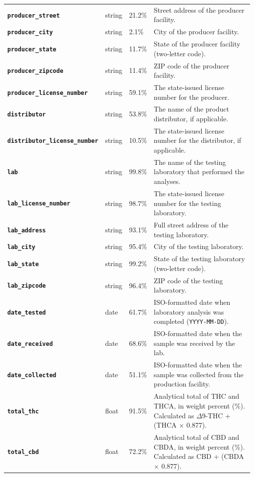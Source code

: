 \documentclass[11pt,letterpaper]{article}
\newcommand{\fieldname}[1]{\texttt{\textbf{#1}}}
\begin{document}
\begin{longtable}{@{}L{4.2cm}C{1.1cm}C{1.6cm}p{9.5cm}@{}}
\fieldname{producer\_street} & string & 21.2\% & Street address of the producer facility. \\[0.4em]
\fieldname{producer\_city} & string & 2.1\% & City of the producer facility. \\[0.4em]
\fieldname{producer\_state} & string & 11.7\% & State of the producer facility (two-letter code). \\[0.4em]
\fieldname{producer\_zipcode} & string & 11.4\% & ZIP code of the producer facility. \\[0.4em]
\fieldname{producer\_license\_number} & string & 59.1\% & The state-issued license number for the producer. \\[0.4em]
\fieldname{distributor} & string & 53.8\% & The name of the product distributor, if applicable. \\[0.4em]
\fieldname{distributor\_license\_number} & string & 10.5\% & The state-issued license number for the distributor, if applicable. \\[0.4em]
\fieldname{lab} & string & 99.8\% & The name of the testing laboratory that performed the analyses. \\[0.4em]
\fieldname{lab\_license\_number} & string & 98.7\% & The state-issued license number for the testing laboratory. \\[0.4em]
\fieldname{lab\_address} & string & 93.1\% & Full street address of the testing laboratory. \\[0.4em]
\fieldname{lab\_city} & string & 95.4\% & City of the testing laboratory. \\[0.4em]
\fieldname{lab\_state} & string & 99.2\% & State of the testing laboratory (two-letter code). \\[0.4em]
\fieldname{lab\_zipcode} & string & 96.4\% & ZIP code of the testing laboratory. \\[0.4em]
\fieldname{date\_tested} & date & 61.7\% & ISO-formatted date when laboratory analysis was completed (\texttt{YYYY-MM-DD}). \\[0.4em]
\fieldname{date\_received} & date & 68.6\% & ISO-formatted date when the sample was received by the lab. \\[0.4em]
\fieldname{date\_collected} & date & 51.1\% & ISO-formatted date when the sample was collected from the production facility. \\[0.4em]
\fieldname{total\_thc} & float & 91.5\% & Analytical total of THC and THCA, in weight percent (\%). Calculated as $\Delta$9-THC + (THCA $\times$ 0.877). \\[0.4em]
\fieldname{total\_cbd} & float & 72.2\% & Analytical total of CBD and CBDA, in weight percent (\%). Calculated as CBD + (CBDA $\times$ 0.877). \\[0.4em]

\end{longtable}
\end{document}
